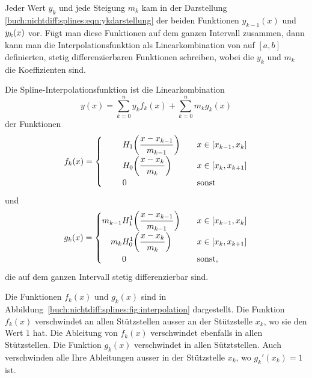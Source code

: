 Jeder Wert $y_k$ und jede Steigung $m_k$ kam in der Darstellung
\eqref{buch:nichtdiff:splines:eqn:ykdarstellung} 
der beiden Funktionen $y_{k-1}(x)$ und $y_{k\mathstrut}(x)$ vor.
Fügt man diese Funktionen auf dem ganzen Intervall zusammen,
dann kann man die Interpolationsfunktion als Linearkombination
von auf $[a,b]$ definierten, stetig differenzierbaren Funktionen
schreiben, wobei die $y_k$ und $m_k$ die Koeffizienten sind.



\begin{satz}
Die Spline-Interpolationsfunktion ist die Linearkombination
\begin{equation}
y(x)
=
\sum_{k=0}^n y_k f_k(x)
+
\sum_{k=0}^n m_k g_k(x)
\label{buch:nichtdiff:spline:eqn:linearkomb}
\end{equation}
der Funktionen
\[
f_k(x)
=
\begin{cases}
\displaystyle
\phantom{m_{k-1\mathstrut}}
H_1\biggl(\frac{x-x_{k-1\mathstrut}}{m_{k-1\mathstrut}}\biggr)
	&\quad x\in[x_{k-1\mathstrut},x_{k\mathstrut}]\\[5pt]
\displaystyle
\phantom{m_{k-1\mathstrut}}
H_0\biggl(\frac{x-x_{k\mathstrut}}{m_{k\mathstrut}}\biggr)
	&\quad x\in[x_{k\mathstrut},x_{k+1\mathstrut}]\\
\phantom{m_{k-1\mathstrut}}
0&\quad\text{sonst}
\end{cases}
\]
und
\[
g_k(x)
=
\begin{cases}
\displaystyle
m_{k-1\mathstrut}
H_1^1\biggl(\frac{x-x_{k-1\mathstrut}}{m_{k-1\mathstrut}}\biggr)
	&\quad x\in[x_{k-1\mathstrut},x_{k\mathstrut}]\\[5pt]
\displaystyle
\phantom{m_{k-1\mathstrut}}\llap{$m_k\mathstrut$}
H_0^1\biggl(\frac{x-x_{k\mathstrut}}{m_{k\mathstrut}}\biggr)
	&\quad x\in[x_{k\mathstrut},x_{k+1\mathstrut}]\\
\phantom{m_{k-1\mathstrut}}
0&\quad\text{sonst,}
\end{cases}
\]
die auf dem ganzen Intervall stetig differenzierbar sind.
\end{satz}

Die Funktionen $f_k(x)$ und $g_k(x)$ sind in
Abbildung~\ref{buch:nichtdiff:splines:fig:interpolation}
dargestellt.
Die Funktion $f_k(x)$ verschwindet an allen Stützstellen ausser
an der Stützstelle $x_k$, wo sie den Wert $1$ hat.
Die Ableitung von $f_k(x)$ verschwindet ebenfalls in allen Stützstellen.
Die Funktion $g_k(x)$ verschwindet in allen Sütztstellen.
Auch verschwinden alle Ihre Ableitungen ausser in der Stützstelle $x_k$,
wo $g_k'(x_k)=1$ ist.


